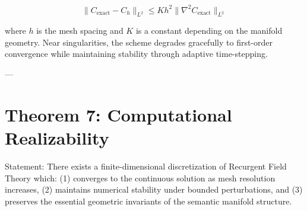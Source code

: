 \begin{equation}
\|C_{\text{exact}} - C_h\|_{L^2} \le K h^2 \|\nabla^2 C_{\text{exact}}\|_{L^2}
\end{equation}

where $h$ is the mesh spacing and $K$ is a constant depending on the manifold geometry. Near singularities, the scheme degrades gracefully to first-order convergence while maintaining stability through adaptive time-stepping.

---

\section{Theorem 7: Computational Realizability}

Statement:  
There exists a finite-dimensional discretization of Recurgent Field Theory which: (1) converges to the continuous solution as mesh resolution increases, (2) maintains numerical stability under bounded perturbations, and (3) preserves the essential geometric invariants of the semantic manifold structure. 
